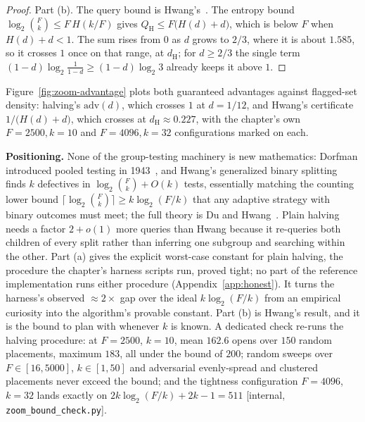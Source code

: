 \documentclass[11pt,a4paper]{article}
\theoremstyle{definition}
\theoremstyle{plain}
\begin{document}
\begin{proof}
Part (b). The query bound is Hwang's~. The entropy bound
$\log_2\binom Fk\le F\,H(k/F)$ gives $Q_{\mathrm{H}}\le F\bigl(H(d)+d\bigr)$,
which is below $F$ when $H(d)+d<1$. The sum rises from $0$ as $d$ grows to
$2/3$, where it is about $1.585$, so it crosses $1$ once on that range, at
$d_{\mathrm{H}}$; for $d\ge2/3$ the single term $(1-d)\log_2\frac1{1-d}\ge(1-d)\log_2 3$
already keeps it above $1$.
\end{proof}


Figure~\ref{fig:zoom-advantage} plots both guaranteed advantages against
flagged-set density: halving's $\mathrm{adv}(d)$, which crosses $1$ at $d=1/12$,
and Hwang's certificate $1/\bigl(H(d)+d\bigr)$, which crosses at
$d_{\mathrm{H}}\approx0.227$, with the chapter's own $F{=}2500,k{=}10$ and
$F{=}4096,k{=}32$ configurations marked on each.

\noindent\textbf{Positioning.} None of the group-testing machinery is new
mathematics: Dorfman introduced pooled testing in 1943~, and Hwang's
generalized binary splitting~ finds $k$ defectives in
$\log_2\binom{F}{k}+O(k)$ tests, essentially matching the counting lower bound
$\lceil\log_2\binom{F}{k}\rceil\ge k\log_2(F/k)$ that any adaptive strategy with
binary outcomes must meet; the full theory is Du and Hwang~. Plain
halving needs a factor $2+o(1)$ more queries than Hwang because it re-queries both children of
every split rather than inferring one subgroup and searching within the other.
Part (a) gives the explicit worst-case constant for plain halving, the procedure
the chapter's harness scripts run, proved tight; no part of the reference
implementation runs either procedure (Appendix~\ref{app:honest}). It turns the
harness's observed $\approx 2\times$ gap over the ideal $k\log_2(F/k)$ from an
empirical curiosity into the algorithm's provable constant. Part (b) is Hwang's
result, and it is the bound to plan with whenever $k$ is known. A dedicated check re-runs the halving procedure:
at $F{=}2500$, $k{=}10$, mean $162.6$ opens over $150$ random placements, maximum
$183$, all under the bound of $200$; random sweeps over $F\in[16,5000]$,
$k\in[1,50]$ and adversarial evenly-spread and clustered placements never exceed
the bound; and the tightness configuration $F{=}4096$, $k{=}32$ lands exactly on
$2k\log_2(F/k)+2k-1=511$ [internal, \texttt{zoom\_bound\_check.py}].
\end{document}
